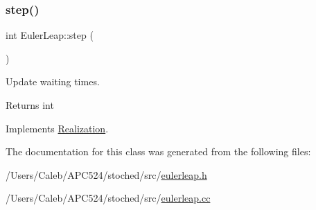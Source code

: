 \subsubsection{\texorpdfstring{step()}{step()}}
{\footnotesize\ttfamily int Euler\+Leap\+::step (\begin{DoxyParamCaption}{ }\end{DoxyParamCaption})\hspace{0.3cm}{\ttfamily [virtual]}}



Update waiting times. 

\begin{DoxyReturn}{Returns}
int 
\end{DoxyReturn}


Implements \hyperlink{class_realization_a9949217117927b149850288f3b74c9ef}{Realization}.



The documentation for this class was generated from the following files\+:\begin{DoxyCompactItemize}
\item 
/\+Users/\+Caleb/\+A\+P\+C524/stoched/src/\hyperlink{eulerleap_8h}{eulerleap.\+h}\item 
/\+Users/\+Caleb/\+A\+P\+C524/stoched/src/\hyperlink{eulerleap_8cc}{eulerleap.\+cc}\end{DoxyCompactItemize}
